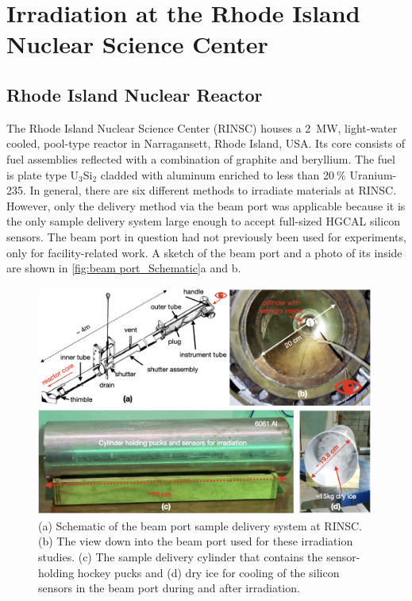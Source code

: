 \section{Irradiation at the Rhode Island Nuclear Science Center}
\label{sec:irradiation}

\subsection{Rhode Island Nuclear Reactor}
\label{subsec:RINSC}
The Rhode Island Nuclear Science Center (RINSC) houses a \SI{2}{\mega\watt}, light-water cooled, pool-type reactor in Narragansett, Rhode Island, USA.
Its core consists of fuel assemblies reflected with a combination of graphite and beryllium.
The fuel is plate type U$_3$Si$_2$ cladded with aluminum enriched to less than 20$~\%$ Uranium-235.
In general, there are six different methods to irradiate materials at RINSC.
However, only the delivery method via the beam port was applicable because it is the only sample delivery system large enough to accept full-sized HGCAL silicon sensors.
The beam port in question had not previously been used for experiments, only for facility-related work.
A sketch of the beam port and a photo of its inside are shown in \ref{fig:beam port_Schematic}a and b.
\begin{figure}
  \begin{center}
    \includegraphics[width=0.99\textwidth]{figures/figures_edited_001.jpeg}
    \caption{(a) Schematic of the beam port sample delivery system at RINSC.
    (b) The view down into the beam port used for these irradiation studies.
    (c) The sample delivery cylinder that contains the sensor-holding hockey pucks and (d) dry ice for cooling of the silicon sensors in the beam port during and after irradiation.
    }
    \label{fig:Beamport_Schematic}
  \end{center}
\end{figure}
